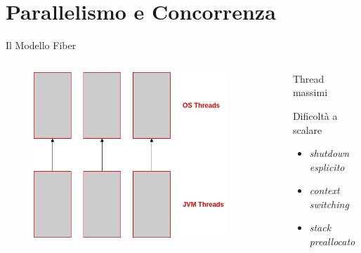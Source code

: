 \section{Parallelismo e Concorrenza}

\begin{frame}[fragile]{Il Modello Fiber}

  \begin{columns}
    \begin{column}{.6\textwidth}
      \begin{figure}
        \centering
            \includegraphics[width=0.9\textwidth]{img/jvm-threads.png}
            \label{JVM threads mapping.}
        \end{figure}
    \end{column}
    \begin{column}{.35\textwidth}
      \begin{block}{\centering Thread massimi}
        \vspace{2mm}
        \vspace{2mm}
      \end{block}
      \vspace{4.5mm}
      \begin{block}{Dificoltà a scalare}
        \begin{itemize}
          \item \textit{shutdown esplicito}
          \item \textit{context switching}
          \item \textit{stack preallocato}
        \end{itemize}
      \end{block}
    \end{column}
  \end{columns}

\end{frame}

